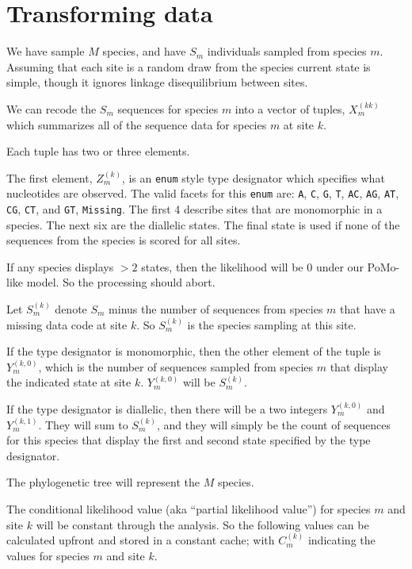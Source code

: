 \documentclass{llncs}
\newcommand{\pomo}{PoMo\xspace}
\begin{document}
\section{Transforming data}
We have sample $M$ species, and have $S_m$ individuals sampled from species $m$.
Assuming that each site is a random draw from the species current state is simple, though it ignores
    linkage disequilibrium between sites.

We can recode the $S_m$ sequences for species $m$ into a vector of tuples, $X_m^{(kk)}$ which 
    summarizes all of the sequence data for species $m$ at site $k$.

Each tuple has two or three elements.

The first element, $Z_m^{(k)}$, is an {\tt enum} style type designator which specifies what nucleotides are observed.
The valid facets for this {\tt enum} are: \texttt{A}, \texttt{C}, \texttt{G}, \texttt{T}, \texttt{AC}, \texttt{AG}, \texttt{AT}, \texttt{CG}, \texttt{CT}, and \texttt{GT}, \texttt{Missing}.
The first 4 describe sites that are monomorphic in a species.
The next six are the diallelic states.
The final state is used if none of the sequences from the species is scored for all sites.

If any species displays $>2$ states, then the likelihood will be 0 under our \pomo-like model.
So the processing should abort.

Let $S_m^{(k)}$ denote $S_m$ minus the number of sequences from species $m$ that have a missing data code at site $k$. 
So $S_m^{(k)}$ is the species sampling at this site.

If the type designator is monomorphic, then the other element of the tuple is $Y_m^{(k,0)}$, which is the number of sequences sampled from species $m$ that display the indicated state at site $k$.
$Y_m^{(k,0)}$ will be $S_m^{(k)}$.


If the type designator is diallelic, then there will be a two integers $Y_m^{(k,0)}$ and $Y_m^{(k,1)}$.
They will sum to $S_m^{(k)}$, and they will simply be the count of sequences for this species that display the first and second state specified by the type designator.

The phylogenetic tree will represent the $M$ species.

The conditional likelihood value (aka ``partial likelihood value'') for species $m$ and site $k$ will be constant through the analysis.
So the following values can be calculated upfront and stored in a constant cache;
with $C_m^{(k)}$ indicating the values for species $m$ and site $k$.
\end{document}
